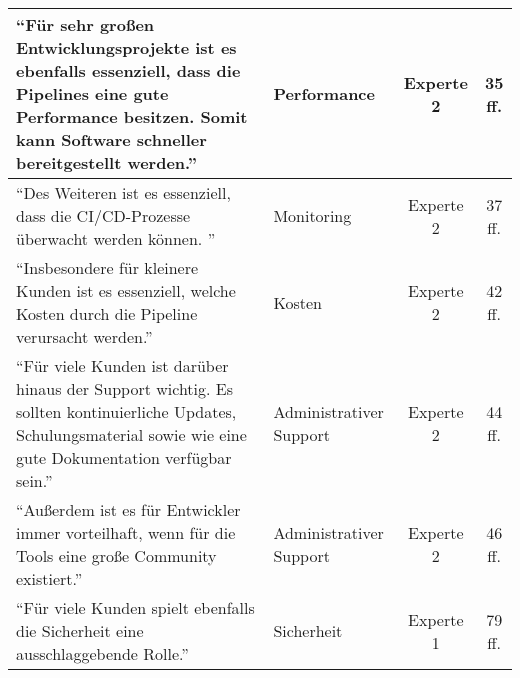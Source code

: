 \begin{longtable}{ |C{6cm}|C{3cm}|c|c| }
        \hline
        \enquote{Für sehr großen Entwicklungsprojekte ist es ebenfalls essenziell, dass die Pipelines eine gute Performance besitzen. Somit kann Software schneller bereitgestellt werden.} & Performance & Experte 2 & 35 ff. \\
        \hline
        \enquote{Des Weiteren ist es essenziell, dass die CI/CD-Prozesse überwacht werden können. } & Monitoring & Experte 2 & 37 ff. \\
        \hline
        \enquote{Insbesondere für kleinere Kunden ist es essenziell, welche Kosten durch die Pipeline verursacht werden.} & Kosten & Experte 2 & 42 ff. \\
        \hline
        \enquote{Für viele Kunden ist darüber hinaus der Support wichtig. Es sollten kontinuierliche Updates, Schulungsmaterial sowie wie eine gute Dokumentation verfügbar sein.} & Administrativer Support & Experte 2 & 44 ff. \\
        \hline
        \enquote{Außerdem ist es für Entwickler immer vorteilhaft, wenn für die Tools eine große Community existiert.} & Administrativer Support & Experte 2 & 46 ff. \\
        \hline
        \enquote{Für viele Kunden spielt ebenfalls die Sicherheit eine ausschlaggebende Rolle.} & Sicherheit & Experte 1 & 79 ff. \\
        \hline
        
        \end{longtable}

